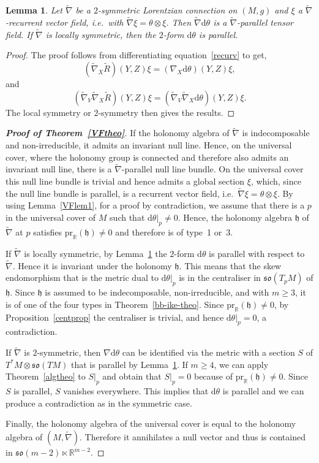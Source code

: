 \documentclass[11pt,a4paper]{amsart}
\newcommand{\tnab}{\widetilde{\nabla}}
\newcommand{\tR}{\widetilde{R}}
\newcommand{\h}{\mathfrak{h}}
\newcommand{\+}{\oplus}
\newcommand{\so}{\mathfrak{so}}
\newcommand{\1}{\mathbf{1}}
\renewcommand{\d}{\mathrm{d}}
\newcommand{\R}{\mathbb{R}} %
\newcommand{\<}{\langle}
\renewcommand{\>}{\rangle}
\theoremstyle{definition}
\theoremstyle{plain}
\newtheorem{lemma}[definition]{Lemma}
\numberwithin{equation}{section}
\begin{document}
\begin{lemma}\label{VFlem3}
Let $\tnab$ be a  $2$-symmetric Lorentzian connection on $(M,g)$ and $\xi$ a $\tnab$-recurrent vector field, i.e.~with $\tnab\xi=\theta\otimes \xi$.
Then $\tnab \d\theta$ is a $\tnab$-parallel tensor field.
If $\tnab$ is locally symmetric, then the $2$-form $\d\theta $ is parallel.
\end{lemma}
\begin{proof}
The proof follows from differentiating equation~\ref{recurv} to get,
\[(\tnab_X\tR)(Y,Z)\xi = (\nabla_X\d\theta)(Y,Z)\xi, \]
and 
\[(\tnab_V\tnab_X\tR)(Y,Z)\xi = (\tnab_V\tnab_X\d\theta)(Y,Z)\xi. \]
The local symmetry or $2$-symmetry then gives the results.
\end{proof}

\begin{proof}[{\bf Proof of Theorem~\ref{VFtheo}}]
If the holonomy algebra  of $\tnab$   is indecomposable and non-irreducible, it admits an invariant null line. Hence, on the universal cover, where the holonomy group is connected and therefore also admits an invariant null line, there is a $\tnab$-parallel null line bundle. 
On the universal cover this null line bundle is trivial and hence admits a global section $\xi$, which, since the null line bundle is parallel,  is a recurrent vector field, i.e.~$\tnab \xi=\theta\otimes \xi$.
By using Lemma~\ref{VFlem1},
for a proof by contradiction, we assume that there is a $p$ in the universal cover of $M$ such that $\d\theta|_p\not=0$. Hence, the holonomy algebra $\h$ of $\tnab$ at $p$ satisfies $\mathrm{pr}_{\R}(\h)\not=0$ and therefore is of type~1 or~3.

If $\tnab$ is locally symmetric, by Lemma~\ref{VFlem3} the $2$-form $\d \theta$ is parallel with respect to $\tnab$. Hence it is invariant under the holonomy $\h$. This means that  
the  skew endomorphism that is the metric dual to $\d \theta|_p$ is in the centraliser in $\so(T_pM) $  of $\h$. Since $\h$ is assumed to be indecomposable, non-irreducible, and with $m\ge 3$, it is of one of the four types in Theorem~\ref{bb-ike-theo}. Since $\mathrm{pr}_{\R}(\h)\not=0$, by Proposition~\ref{centprop} the centraliser is trivial, and hence $\d\theta|_p=0$, a contradiction.

If $\tnab$ is $2$-symmetric, then $\nabla \d\theta$ can be 
 identified via the metric with a  section $S$ of $T^*M\otimes \so(TM)$ that is parallel by Lemma~\ref{VFlem3}. If 
 $m\ge 4$, we can apply Theorem~\ref{algtheo} to $S|_p$ and obtain that $S|_p=0$ because of $\mathrm{pr}_{\R}(\h)\not=0$. Since $S$ is parallel, $S$ vanishes everywhere. This implies that $\d\theta$ is parallel and we can produce a contradiction as in the symmetric case.

Finally, the holonomy algebra of the universal cover is equal to the holonomy algebra of $(M,\tnab)$. Therefore it    annihilates a null vector and thus is contained in $\so(m-2) \ltimes \R^{m-2}$.
\end{proof}
\end{document}
